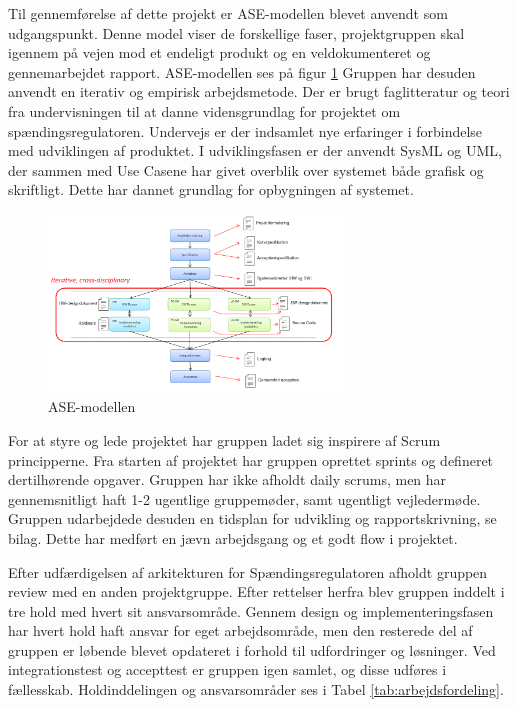 
Til gennemførelse af dette projekt er ASE-modellen blevet anvendt som udgangspunkt. Denne model viser de forskellige faser, projektgruppen skal igennem på vejen mod et endeligt produkt og en veldokumenteret og gennemarbejdet rapport. ASE-modellen ses på figur \ref{fig:Asemodel} Gruppen har desuden anvendt en iterativ og empirisk arbejdsmetode. Der er brugt faglitteratur og teori fra undervisningen til at danne vidensgrundlag for projektet om spændingsregulatoren. Undervejs er der indsamlet nye erfaringer i forbindelse med udviklingen af produktet. 
I udviklingsfasen er der anvendt SysML og UML, der sammen med Use Casene har givet overblik over systemet både grafisk og skriftligt. Dette har dannet grundlag for opbygningen af systemet. 

\begin{figure}[H] 
	\centering
	\includegraphics[width=0.7\textwidth]{figure/Asemodel}
	\caption{ASE-modellen}
	\label{fig:Asemodel}
\end{figure}

For at styre og lede projektet har gruppen ladet sig inspirere af Scrum principperne. Fra starten af projektet har gruppen oprettet sprints og defineret dertilhørende opgaver. Gruppen har ikke afholdt daily scrums, men har gennemsnitligt haft 1-2 ugentlige gruppemøder, samt ugentligt vejledermøde. Gruppen udarbejdede desuden en tidsplan for udvikling og rapportskrivning, se bilag. Dette har medført en jævn arbejdsgang og et godt flow i projektet. \newline

Efter udfærdigelsen af arkitekturen for Spændingsregulatoren afholdt gruppen review med en anden projektgruppe. Efter rettelser herfra blev gruppen inddelt i tre hold med hvert sit ansvarsområde. Gennem design og implementeringsfasen har hvert hold haft ansvar for eget arbejdsområde, men den resterede del af gruppen er løbende blevet opdateret i forhold til udfordringer og løsninger. 
Ved integrationstest og accepttest er gruppen igen samlet, og disse udføres i fællesskab. 
Holdinddelingen og ansvarsområder ses i Tabel \ref{tab:arbejdsfordeling}.

